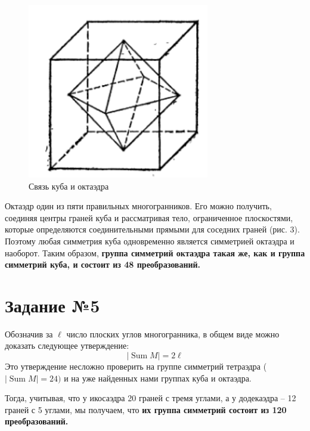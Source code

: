 \documentclass[12pt]{article}
\DeclareMathOperator{\Sum}{\mathop{Sum}}
\begin{document}
\begin{figure} 
	\includegraphics{1_4}
	\caption{Связь куба и октаэдра}
\end{figure}
Октаэдр один из пяти правильных
многогранников. Его можно получить, соединяя центры граней куба и рассматривая тело, ограниченное плоскостями, которые определяются соединительными прямыми для соседних граней (рис. 3). Поэтому любая симметрия куба одновременно является симметрией октаэдра и наоборот. Таким образом, \textbf{группа симметрий октаэдра такая же, как и группа симметрий куба, и состоит из 48 преобразований.}

\section{Задание №5}

Обозначив за $ \ell $ число плоских углов многогранника, в общем виде можно доказать следующее утверждение: 
\begin{equation}
|\Sum M| = 2\ell
\end{equation}
Это утверждение несложно проверить на группе симметрий тетраэдра ($|\Sum M| = 24)$ и на уже найденных нами группах куба и октаэдра. 

Тогда, учитывая, что у икосаэдра 20 граней с тремя углами, а у додекаэдра -- 12 граней с 5 углами, мы получаем, что \textbf{их группа симметрий состоит из 120 преобразований.}



\end{document}
